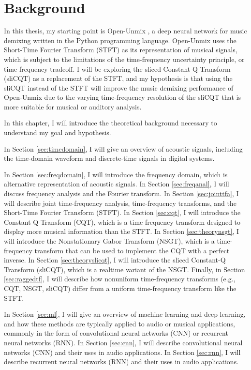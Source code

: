 \documentclass[report.tex]{subfiles}
\begin{document}
\section{Background}
\label{ch:background}

In this thesis, my starting point is Open-Unmix \parencite{umx}, a deep neural network for music demixing written in the Python programming language. Open-Unmix uses the Short-Time Fourier Transform (STFT) as its representation of musical signals, which is subject to the limitations of the time-frequency uncertainty principle, or time-frequency tradeoff. I will be exploring the sliced Constant-Q Transform (sliCQT) as a replacement of the STFT, and my hypothesis is that using the sliCQT instead of the STFT will improve the music demixing performance of Open-Unmix due to the varying time-frequency resolution of the sliCQT that is more suitable for musical or auditory analysis.

In this chapter, I will introduce the theoretical background necessary to understand my goal and hypothesis.

In Section \ref{sec:timedomain}, I will give an overview of acoustic signals, including the time-domain waveform and discrete-time signals in digital systems.

In Section \ref{sec:freqdomain}, I will introduce the frequency domain, which is alternative representation of acoustic signals. In Section \ref{sec:freqanal}, I will discuss frequency analysis and the Fourier transform. In Section \ref{sec:jointtfa}, I will describe joint time-frequency analysis, time-frequency transforms, and the Short-Time Fourier Transform (STFT). In Section \ref{sec:cqt}, I will introduce the Constant-Q Transform (CQT), which is a time-frequency transform designed to display more musical information than the STFT. In Section \ref{sec:theorynsgt}, I will introduce the Nonstationary Gabor Transform (NSGT), which is a time-frequency transform that can be used to implement the CQT with a perfect inverse. In Section \ref{sec:theoryslicqt}, I will introduce the sliced Constant-Q Transform (sliCQT), which is a realtime variant of the NSGT. Finally, in Section \ref{sec:raggedtf}, I will describe how nonuniform time-frequency transforms (e.g., CQT, NSGT, sliCQT) differ from a uniform time-frequency transform like the STFT.

In Section \ref{sec:ml}, I will give an overview of machine learning and deep learning, and how these methods are typically applied to audio or musical applications, commonly in the form of convolutional neural networks (CNN) or recurrent neural networks (RNN). In Section \ref{sec:cnn}, I will describe convolutional neural networks (CNN) and their uses in audio applications. In Section \ref{sec:rnn}, I will describe recurrent neural networks (RNN) and their uses in audio applications.
\end{document}
